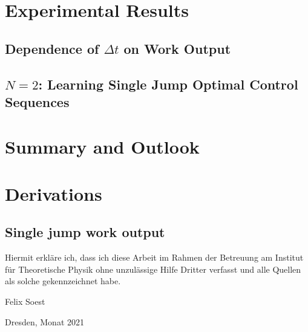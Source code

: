 \chapter{Experimental Results}

\section{Dependence of $\Delta t$ on Work Output}

\section{$N=2$: Learning Single Jump Optimal Control Sequences}


\chapter{Summary and Outlook}


\appendix
\chapter{Derivations}
\section{Single jump work output}








\clearpage
\thispagestyle{empty}
\vspace*{1.5em}

Hiermit erkläre ich, dass ich diese Arbeit im Rahmen der Betreuung am Institut
für Theoretische Physik ohne unzulässige Hilfe Dritter verfasst und alle Quellen als solche gekennzeichnet habe.

\vspace*{45em}

Felix Soest \par
Dresden, Monat 2021


